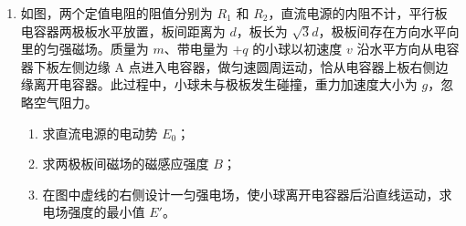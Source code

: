 \documentclass[\gkver]{gaokaozhenti}
\begin{document}
\begin{enumerate}
{（3）从“$\times$1”挡位换成“$\times$10”挡位，即开关 S 从 m 拨向 n，全电路电阻增大，干路电流减小，①、② 短接时，为了使电流表满偏，则需要增大通过电流计 G 所在支路的电流，所以需要将 $R_{0}$ 的滑片向上调节；

（4）在“$\times$10”挡位，电路图结构简化如图


第一次，当 ①、② 短接，全电路的总电阻为

$R = R_{n} + \frac{(R_{G} + R_{0\text{上}})R_{0\text{下}}}{R_{G} + R_{0m}}$

通过干路的电流为

$I = \frac{E}{R}$

电流表满偏，根据并联电路中电流之比等于电阻反比可知

$\frac{I_{G}}{I - I_{G}} = \frac{R_{0\text{下}}}{R_{G} + R_{0\text{上}}}$

第二次，①、② 之间接入 $R_{1} = 100\UO$，全电路总电阻为 $R + R_{1}$，通过干路的电流为

$I_{1} = \frac{E}{R + R_{1}}$

电流表偏转了量程的 $\frac{2}{3}$，则

$\frac{\frac{2}{3}I_{G}}{I_{1} - \frac{2}{3}I_{G}} = \frac{R_{0\text{下}}}{R_{G} + R_{0\text{上}}}$

结合第一次和第二次解得

$R = 2R_{1} = 200\UO$

第三次，①、② 之间接入 $R_{x}$，全电路总电阻为 $R_{x} + R_{1}$，通过干路的电流为

$I_{x} = \frac{E}{R_{x} + R_{1}}$

电流表偏转了量程的 $\frac{1}{3}$，则

$\frac{\frac{1}{3}I_{G}}{I_{x} - \frac{1}{3}I_{G}} = \frac{R_{0\text{下}}}{R_{G} + R_{0\text{上}}}$

结合第二次和第三次，解得：$R_{x} = R + 2R_{1} = 400\UO$。
}

\item
如图，两个定值电阻的阻值分别为 $R_{1}$ 和 $R_{2}$，直流电源的内阻不计，平行板电容器两极板水平放置，板间距离为 $d$，板长为 $\sqrt{3}d$，极板间存在方向水平向里的匀强磁场。质量为 $m$、带电量为 $+q$ 的小球以初速度 $v$ 沿水平方向从电容器下板左侧边缘 A 点进入电容器，做匀速圆周运动，恰从电容器上板右侧边缘离开电容器。此过程中，小球未与极板发生碰撞，重力加速度大小为 $g$，忽略空气阻力。
\begin{enumerate}
	\item
	求直流电源的电动势 $E_{0}$；
	\item
	求两极板间磁场的磁感应强度 $B$；
	\item
	在图中虚线的右侧设计一匀强电场，使小球离开电容器后沿直线运动，求电场强度的最小值 $E'$。
\end{enumerate}


\end{enumerate}
\end{document}
